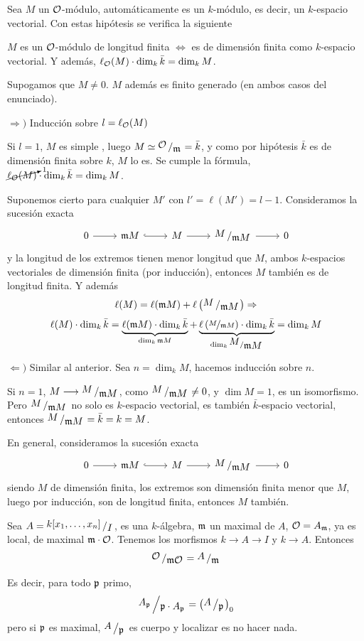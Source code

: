 Sea $M$ un $\mathcal{O}$-m\'odulo, autom\'aticamente es un $k$-m\'odulo, es decir, un $k$-espacio vectorial. Con estas hip\'otesis se verifica la siguiente
\begin{prop} $M$ es un $\mathcal{O}$-m\'odulo de longitud finita $\iff$ es de dimensi\'on finita como $k$-espacio vectorial. Y adem\'as, $\ell_{\mathcal{O}} (M) \cdot \dim_k \bar k = \dim_k M$. 
\end{prop}
\begin{dem}
    Supogamos que $M\neq 0$. $M$ adem\'as es finito generado (en ambos casos del enunciado).

    $\Rightarrow)$ Inducci\'on sobre $l = \ell_{\mathcal{O}}(M)$

    Si $l=1$, $M$ es simple , luego $M \simeq \modulo{\mc O}{\m} = \bar k$, y como por hip\'otesis $\bar k$ es de dimensi\'on finita sobre $k$, $M$ lo es. Se cumple la f\'ormula, $\cancelto{1}{\ell_{\mathcal{O}} (M)} \cdot \dim_k \bar k = \dim_k M$.

    Suponemos cierto para cualquier $M'$ con $l'= \ell(M') = l-1$. Consideramos la sucesi\'on exacta
    $$\bt 0 \rar & \m M  \rar[hook] & M  \rar & \modulo{M}{\m M}  \rar & 0 \et$$
    y la longitud de los extremos tienen menor longitud que $M$, ambos $k$-espacios vectoriales de dimensi\'on finita (por inducci\'on), entonces $M$ tambi\'en es de longitud finita. Y adem\'as
    $$\ell(M) = \ell(\m M) + \ell\left(  \modulo{M}{\m M}\right) \Rightarrow$$
    $$\ell(M)\cdot \dim_k \bar k  = \underbrace{\ell(\m M)\cdot \dim_k \bar k  }_{\dim _k \m M}+\underbrace{ \ell \left(  \nicefrac{M}{\m M}\right) \cdot \dim_k \bar k}_{\dim_k  \modulo{M}{\m M}} = \dim_k M$$

    $\Leftarrow)$ Similar al anterior. Sea $n = \dim_k M$, hacemos inducci\'on sobre $n$. 

    Si $n=1$, $M \longrightarrow  \modulo{M}{\m M}$, como $ \modulo{M}{\m M} \neq 0$, y $\dim M=1$, es un isomorfismo. Pero $ \modulo{M}{\m M}$ no solo es $k$-espacio vectorial, es tambi\'en $\bar k$-espacio vectorial, entonces $ \modulo{M}{\m M} = \bar k = k = M$. 

    En general, consideramos la sucesi\'on exacta
    $$\bt 0 \rar & \m M  \rar[hook] & M  \rar & \modulo{M}{\m M}  \rar & 0 \et$$
    siendo $M$ de dimensi\'on finita, los extremos son dimensi\'on finita menor que $M$, luego por inducci\'on, son de longitud finita, entonces $M$ tambi\'en. 
\end{dem}
\begin{ejem}
    Sea $A = \modulo{k[x_1, \ldots, x_n]}{I}$, es una $k$-\'algebra, $\mathfrak{m}$ un maximal de $A$, $\mathcal{O} = A_{\mathfrak{m}}$, ya es local, de maximal $\mathfrak{m} \cdot \mathcal{O}$. Tenemos los morfismos $k \to A \to I$ y $k \to A$. Entonces
    $$\modulo{\mc O}{\m \mc O} = \modulo{A}{\m}$$

    Es decir, para todo $\mathfrak{p}$ primo, 
    $$\modulo{A_\p}{\p \cdot A_\p} = \left( \modulo{A}{\p} \right)_0$$
    pero si $\mathfrak{p}$ es maximal, $\modulo{A}{\p}$ es cuerpo y localizar es no hacer nada.
\end{ejem}
